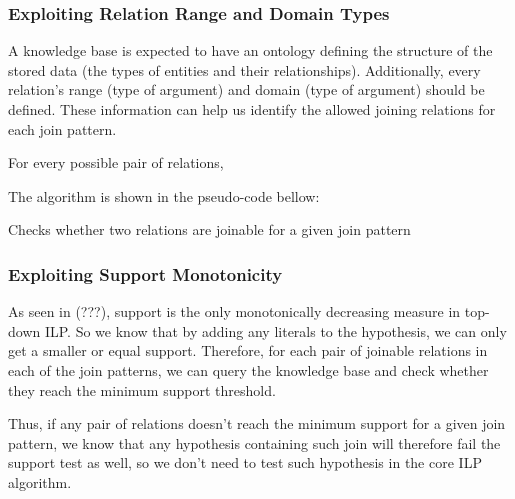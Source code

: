 \subsubsection{Exploiting Relation Range and Domain Types}

A knowledge base is expected to have an ontology defining the structure of the stored data (the types of entities and their relationships). Additionally, every relation's range (type of  argument) and domain (type of  argument) should be defined. These information can help us identify the allowed joining relations for each join pattern.

For every possible pair of relations, 

The algorithm is shown in the pseudo-code bellow:

\begin{algorithm}[5]
 \caption{Checks whether two relations are joinable for a given join pattern}
 
\end{algorithm}

\subsubsection{Exploiting Support Monotonicity}

As seen in (???), support is the only monotonically decreasing measure in top-down ILP. So we know that by adding any literals to the hypothesis, we can only get a smaller or equal support. Therefore, for each pair of joinable relations in each of the join patterns, we can query the knowledge base and check whether they reach the minimum support threshold.

Thus, if any pair of relations doesn't reach the minimum support for a given join pattern, we know that any hypothesis containing such join will therefore fail the support test as well, so we don't need to test such hypothesis in the core ILP algorithm.


